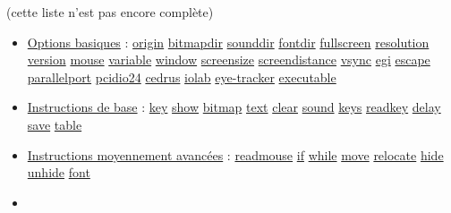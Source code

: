 \documentclass[
]{book}
\begin{document}
(cette liste n'est pas encore complète)

\begin{itemize}
\item
  \protect\hyperlink{options}{Options basiques} : \protect\hyperlink{options-origin}{origin} \textbar{} \protect\hyperlink{options-origin}{bitmapdir} \textbar{} \protect\hyperlink{options-origin}{sounddir} \textbar{} \protect\hyperlink{options-origin}{fontdir} \textbar{} \protect\hyperlink{options-fullscreen}{fullscreen} \textbar{} \protect\hyperlink{options-resolution}{resolution} \textbar{} \protect\hyperlink{options-version}{version} \textbar{} \protect\hyperlink{options-mouse}{mouse}\textbar{} \protect\hyperlink{options-variable}{variable} \textbar{} \protect\hyperlink{options-window}{window} \textbar{} \protect\hyperlink{options-screensize}{screensize} \textbar{} \protect\hyperlink{options-screendistance}{screendistance} \textbar{} \protect\hyperlink{options-vsync}{vsync} \textbar{} \protect\hyperlink{options-egi}{egi}\textbar{} \protect\hyperlink{options-escape}{escape}\textbar{} \protect\hyperlink{options-parallelport}{parallelport}\textbar{} \protect\hyperlink{options-pcidio24}{pcidio24}\textbar{} \protect\hyperlink{options-cedrus}{cedrus} \textbar{} \protect\hyperlink{options-iolab}{iolab}\textbar{} \protect\hyperlink{option-et}{eye-tracker}\textbar{} \protect\hyperlink{options-executable}{executable}
\item
  \protect\hyperlink{_commonly_used_instructions}{Instructions de base} : \protect\hyperlink{task-key}{key}\textbar{} \protect\hyperlink{task-show}{show} \textbar{} \protect\hyperlink{task-bitmap}{bitmap} \textbar{} \protect\hyperlink{task-text}{text}\textbar{} \protect\hyperlink{task-clear}{clear}\textbar{} \protect\hyperlink{task-sound}{sound}\textbar{} \protect\hyperlink{task-key}{keys}\textbar{} \protect\hyperlink{task-readkey}{readkey} \textbar{} \protect\hyperlink{task-delay}{delay} \textbar{} \protect\hyperlink{task-save}{save} \textbar{} \protect\hyperlink{task-table}{table}
\item
  \protect\hyperlink{less_often_used_instructions}{Instructions moyennement avancées} : \protect\hyperlink{task-readmouse}{readmouse} \textbar{} \protect\hyperlink{task-if}{if} \textbar{} \protect\hyperlink{task-while}{while} \textbar{} \protect\hyperlink{task-move}{move} \textbar{} \protect\hyperlink{task-relocate}{relocate} \textbar{} \protect\hyperlink{task-hide}{hide} \textbar{} \href{task-unhide}{unhide} \textbar{} \protect\hyperlink{task-font}{font}
\item

\end{itemize}
\end{document}
